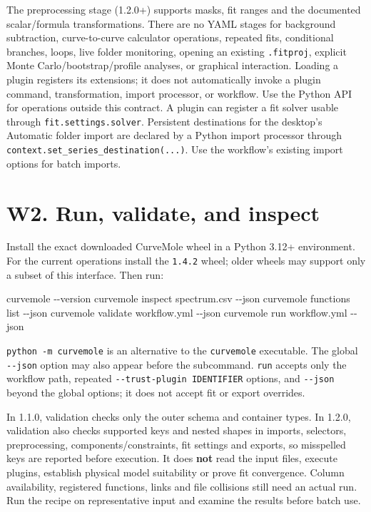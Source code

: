 \documentclass[
  10pt,
  a4paper,
  oneside]{scrreprt}
\newenvironment{Shaded}{}{}
\newcommand{\ExtensionTok}[1]{#1}
\newcommand{\NormalTok}[1]{#1}
\begin{document}
The preprocessing stage (1.2.0+) supports masks, fit ranges and the
documented scalar/formula transformations. There are no YAML stages for
background subtraction, curve-to-curve calculator operations, repeated
fits, conditional branches, loops, live folder monitoring, opening an
existing \texttt{.fitproj}, explicit Monte Carlo/bootstrap/profile
analyses, or graphical interaction. Loading a plugin registers its
extensions; it does not automatically invoke a plugin command,
transformation, import processor, or workflow. Use the Python API for
operations outside this contract. A plugin can register a fit solver
usable through \texttt{fit.settings.solver}. Persistent destinations for
the desktop's Automatic folder import are declared by a Python import
processor through \texttt{context.set\_series\_destination(...)}. Use
the workflow's existing import options for batch imports.

\hypertarget{w2.-run-validate-and-inspect}{%
\section{W2. Run, validate, and
inspect}\label{w2.-run-validate-and-inspect}}

Install the exact downloaded CurveMole wheel in a Python 3.12+
environment. For the current operations install the \texttt{1.4.2}
wheel; older wheels may support only a subset of this interface. Then
run:

\begin{Shaded}
\begin{Highlighting}[]
\ExtensionTok{curvemole}\NormalTok{ {-}{-}version}
\ExtensionTok{curvemole}\NormalTok{ inspect spectrum.csv {-}{-}json}
\ExtensionTok{curvemole}\NormalTok{ functions list {-}{-}json}
\ExtensionTok{curvemole}\NormalTok{ validate workflow.yml {-}{-}json}
\ExtensionTok{curvemole}\NormalTok{ run workflow.yml {-}{-}json}
\end{Highlighting}
\end{Shaded}

\texttt{python\ -m\ curvemole} is an alternative to the
\texttt{curvemole} executable. The global \texttt{-\/-json} option may
also appear before the subcommand. \texttt{run} accepts only the
workflow path, repeated \texttt{-\/-trust-plugin\ IDENTIFIER} options,
and \texttt{-\/-json} beyond the global options; it does not accept fit
or export overrides.

In 1.1.0, validation checks only the outer schema and container types.
In 1.2.0, validation also checks supported keys and nested shapes in
imports, selectors, preprocessing, components/constraints, fit settings
and exports, so misspelled keys are reported before execution. It does
\textbf{not} read the input files, execute plugins, establish physical
model suitability or prove fit convergence. Column availability,
registered functions, links and file collisions still need an actual
run. Run the recipe on representative input and examine the results
before batch use.
\end{document}

